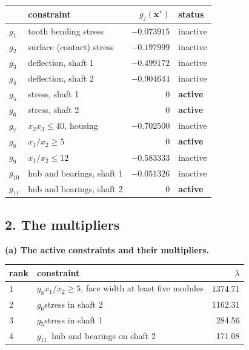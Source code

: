 \documentclass[11pt,a4paper]{article}
\begin{document}
\begin{center}
\begin{tabular}{llr l}
\toprule
 & constraint & $g_j(\bm{x}^\star)$ & status \\
\midrule
$g_1$ & tooth bending stress        & $-0.073915$ & inactive \\
$g_2$ & surface (contact) stress    & $-0.197999$ & inactive \\
$g_3$ & deflection, shaft 1         & $-0.499172$ & inactive \\
$g_4$ & deflection, shaft 2         & $-0.904644$ & inactive \\
$g_5$ & stress, shaft 1             & $0$         & \textbf{active} \\
$g_6$ & stress, shaft 2             & $0$         & \textbf{active} \\
$g_7$ & $x_2x_3 \le 40$, housing    & $-0.702500$ & inactive \\
$g_8$ & $x_1/x_2 \ge 5$             & $0$         & \textbf{active} \\
$g_9$ & $x_1/x_2 \le 12$            & $-0.583333$ & inactive \\
$g_{10}$ & hub and bearings, shaft 1 & $-0.051326$ & inactive \\
$g_{11}$ & hub and bearings, shaft 2 & $0$        & \textbf{active} \\
\bottomrule
\end{tabular}
\end{center}

\subsection*{2. The multipliers}

\textbf{(a) The active constraints and their multipliers.}

\begin{center}
\begin{tabular}{llr}
\toprule
rank & constraint & $\lambda$ \\
\midrule
1 & $g_8$\quad $x_1/x_2 \ge 5$, face width at least five modules & 1374.71 \\
2 & $g_6$\quad stress in shaft 2                                 & 1162.31 \\
3 & $g_5$\quad stress in shaft 1                                 & 284.56 \\
4 & $g_{11}$\, hub and bearings on shaft 2                       & 171.08 \\
\bottomrule
\end{tabular}
\end{center}
\end{document}
